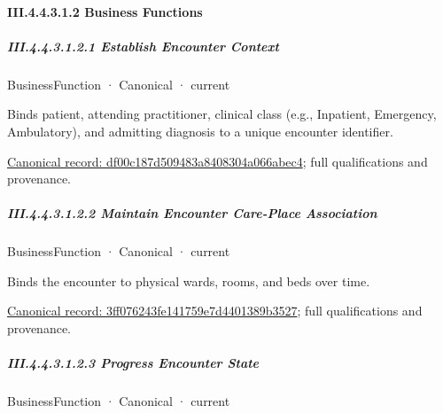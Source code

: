 \paragraph*{III.4.4.3.1.2 Business Functions}
\label{navigation:III.4.4.3.1.2}

\subparagraph*{III.4.4.3.1.2.1 Establish Encounter Context}
\label{navigation:III.4.4.3.1.2.1}

\label{element:df00c187d509483a8408304a066abec4}
{\small BusinessFunction · Canonical · current}\par

Binds patient, attending practitioner, clinical class (e.g., Inpatient, Emergency, Ambulatory), and admitting diagnosis to a unique encounter identifier.


{\footnotesize \href{../../../../../../../continuum/business/business-function/df00c187d509483a8408304a066abec4.md}{Canonical record: df00c187d509483a8408304a066abec4}; full qualifications and provenance.}\par
\subparagraph*{III.4.4.3.1.2.2 Maintain Encounter Care-Place Association}
\label{navigation:III.4.4.3.1.2.2}

\label{element:3ff076243fe141759e7d4401389b3527}
{\small BusinessFunction · Canonical · current}\par

Binds the encounter to physical wards, rooms, and beds over time.


{\footnotesize \href{../../../../../../../continuum/business/business-function/3ff076243fe141759e7d4401389b3527.md}{Canonical record: 3ff076243fe141759e7d4401389b3527}; full qualifications and provenance.}\par
\subparagraph*{III.4.4.3.1.2.3 Progress Encounter State}
\label{navigation:III.4.4.3.1.2.3}

\label{element:223b1140628b444482bfb0a2c870d751}
{\small BusinessFunction · Canonical · current}\par

